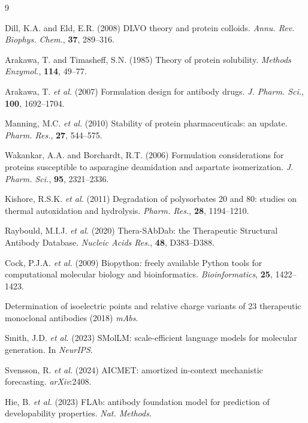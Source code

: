 \documentclass[twocolumn,10pt]{article}
\begin{document}
\begin{thebibliography}{9}
\small

 Dill, K.A. and Eld, E.R. (2008) DLVO theory and protein
colloids. \textit{Annu. Rev. Biophys. Chem.}, \textbf{37}, 289--316.

 Arakawa, T. and Timasheff, S.N. (1985) Theory of protein
solubility. \textit{Methods Enzymol.}, \textbf{114}, 49--77.

 Arakawa, T. \textit{et al.} (2007) Formulation design for
antibody drugs. \textit{J. Pharm. Sci.}, \textbf{100}, 1692--1704.

 Manning, M.C. \textit{et al.} (2010) Stability of protein
pharmaceuticals: an update. \textit{Pharm. Res.}, \textbf{27}, 544--575.

 Wakankar, A.A. and Borchardt, R.T. (2006) Formulation
considerations for proteins susceptible to asparagine deamidation and aspartate
isomerization. \textit{J. Pharm. Sci.}, \textbf{95}, 2321--2336.

 Kishore, R.S.K. \textit{et al.} (2011) Degradation of
polysorbates 20 and 80: studies on thermal autoxidation and hydrolysis.
\textit{Pharm. Res.}, \textbf{28}, 1194--1210.

 Raybould, M.I.J. \textit{et al.} (2020) Thera-SAbDab:
the Therapeutic Structural Antibody Database. \textit{Nucleic Acids Res.},
\textbf{48}, D383--D388.

 Cock, P.J.A. \textit{et al.} (2009) Biopython: freely
available Python tools for computational molecular biology and bioinformatics.
\textit{Bioinformatics}, \textbf{25}, 1422--1423.

 Determination of isoelectric points and relative charge
variants of 23 therapeutic monoclonal antibodies (2018) \textit{mAbs}.

 Smith, J.D. \textit{et al.} (2023) SMolLM: scale-efficient
language models for molecular generation. In \textit{NeurIPS}.

 Svensson, R. \textit{et al.} (2024) AICMET: amortized
in-context mechanistic forecasting. \textit{arXiv}:2408.

 Hie, B. \textit{et al.} (2023) FLAb: antibody foundation model
for prediction of developability properties. \textit{Nat. Methods}.

\end{thebibliography}
\end{document}
